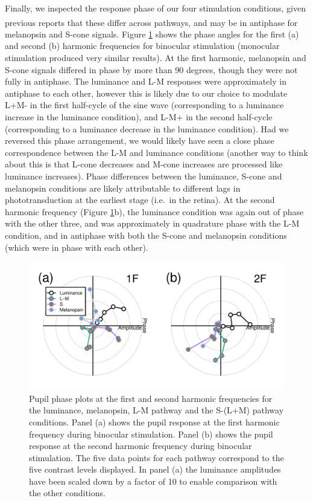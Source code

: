 \documentclass[
]{article}
\begin{document}
Finally, we inspected the response phase of our four stimulation conditions, given previous reports that these differ across pathways\textsuperscript{}, and may be in antiphase for melanopsin and S-cone signals. Figure \ref{fig:phaseplots} shows the phase angles for the first (a) and second (b) harmonic frequencies for binocular stimulation (monocular stimulation produced very similar results). At the first harmonic, melanopsin and S-cone signals differed in phase by more than 90 degrees, though they were not fully in antiphase. The luminance and L-M responses were approximately in antiphase to each other, however this is likely due to our choice to modulate L+M- in the first half-cycle of the sine wave (corresponding to a luminance increase in the luminance condition), and L-M+ in the second half-cycle (corresponding to a luminance decrease in the luminance condition). Had we reversed this phase arrangement, we would likely have seen a close phase correspondence between the L-M and luminance conditions (another way to think about this is that L-cone decreases and M-cone increases are processed like luminance increases). Phase differences between the luminance, S-cone and melanopsin conditions are likely attributable to different lags in phototransduction at the earliest stage (i.e.~in the retina). At the second harmonic frequency (Figure \ref{fig:phaseplots}b), the luminance condition was again out of phase with the other three, and was approximately in quadrature phase with the L-M condition, and in antiphase with both the S-cone and melanopsin conditions (which were in phase with each other).

\begin{figure}

{\centering \includegraphics{Figures/phaseplots} 

}

\caption{Pupil phase plots at the first and second harmonic frequencies for the luminance, melanopsin, L-M pathway and the S-(L+M) pathway conditions. Panel (a) shows the pupil response at the first harmonic frequency during binocular stimulation. Panel (b) shows the pupil response at the second harmonic frequency during binocular stimulation. The five data points for each pathway correspond to the five contrast levels displayed. In panel (a) the luminance amplitudes have been scaled down by a factor of 10 to enable comparison with the other conditions.}\label{fig:phaseplots}
\end{figure}
\end{document}
